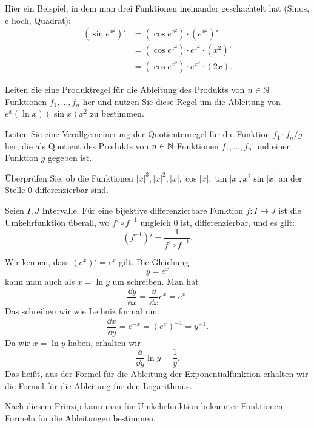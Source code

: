 \begin{bsp}
	Hier ein Beispiel, in dem man drei Funktionen ineinander geschachtelt hat (Sinus, e hoch, Quadrat): 
	\begin{align*}
		(\sin e^{x^2})' & = (\cos e^{x^2} ) \cdot (e^{x^2})' 
		\\ & = (\cos e^{x^2} ) \cdot e^{x^2} \cdot (x^2)' 
		\\ & = (\cos e^{x^2} ) \cdot e^{x^2} \cdot (2 x ). 
	\end{align*}
\end{bsp}

\begin{aufg}
	Leiten Sie eine Produktregel für die Ableitung des Produkts von $n \in \mathbb{N}$ Funktionen $f_1,\ldots, f_n$ her und nutzen Sie diese Regel um die Ableitung von $e^x (\ln x) (\sin x) x^2$ zu bestimmen. 
\end{aufg} 

\begin{aufg}
	Leiten Sie eine Verallgemeinerung der Quotientenregel für die Funktion $f_1 \cdot f_n / g$ her, die als Quotient des Produkts von $n \in \mathbb{N}$ Funktionen $f_1,\ldots,f_n$ und einer Funktion $g$ gegeben ist. 
\end{aufg} 

\begin{aufg}
	Überprüfen Sie, ob die Funktionen $|x|^3, |x|^2, |x|, \cos|x|, \tan |x|, x^2 \sin |x|$ an der Stelle $0$ differenzierbar sind. 
\end{aufg} 

\begin{thm} 
	Seien $I, J$ Intervalle. Für eine bijektive differenzierbare Funktion $ f : I \to J$ ist die Umkehrfunktion überall, wo $f' \circ f^{-1}$ ungleich $0$ ist, differenzierbar, und es gilt: 
	\[
		(f^{-1})' = \frac{1}{f' \circ f^{-1}}. 
	\]
\end{thm} 

\begin{bsp}
	Wir kennen, dass $(e^x)' = e^x$ gilt. 
	Die Gleichung 
	\[
		y = e^x
	\]
	kann man auch als $x = \ln y$ um schreiben. Man hat 
	\[
		\frac{\dd y}{\dd x} = \frac{\dd}{\dd x} e^x = e^x. 
	\]
	Das schreiben wir wie Leibniz formal um: 
	\[
		\frac{\dd x}{\dd y} = e^{-x} = (e^x)^{-1} = y^{-1}. 
	\]
	Da wir $x = \ln y$ haben, erhalten wir 
	\[
		\frac{\dd }{\dd y}  \ln y  = \frac{1}{y}. 
	\]
	Das heißt, aus der Formel für die Ableitung der Exponentialfunktion erhalten wir die Formel für die Ableitung für den Logarithmus. 
	
	Nach diesem Prinzip kann man für Umkehrfunktion bekannter Funktionen Formeln für die Ableitungen bestimmen. 
\end{bsp} 


